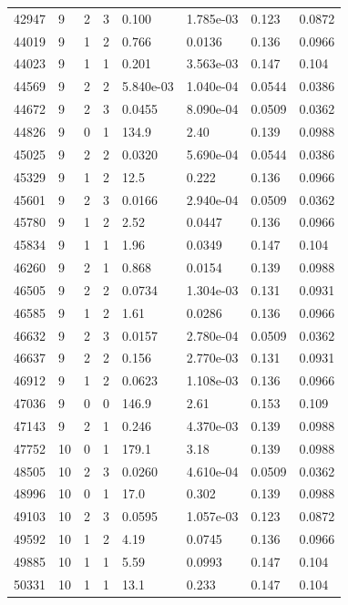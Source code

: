 \documentclass[preview]{standalone}
\begin{document}
{{{{{\begin{tabular}{L{1.2cm}C{1.2cm} C{0.3cm}C{0.5cm} C{1.4cm}C{1.4cm} C{1.4cm}C{1.4cm}}
  42947  &     9  & 2     &  3 &  0.100  & 1.785e-03  & 0.123 &  0.0872   \\ 
  44019  &     9  & 1     &  2 &  0.766  & 0.0136  & 0.136 &  0.0966   \\ 
  44023  &     9  & 1     &  1 &  0.201  & 3.563e-03  & 0.147 &  0.104   \\ 
  44569  &     9  & 2     &  2 &  5.840e-03  & 1.040e-04  & 0.0544 &  0.0386   \\ 
  44672  &     9  & 2     &  3 &  0.0455  & 8.090e-04  & 0.0509 &  0.0362   \\ 
  44826  &     9  & 0     &  1 &  134.9  & 2.40  & 0.139 &  0.0988   \\ 
  45025  &     9  & 2     &  2 &  0.0320  & 5.690e-04  & 0.0544 &  0.0386   \\ 
  45329  &     9  & 1     &  2 &  12.5  & 0.222  & 0.136 &  0.0966   \\ 
  45601  &     9  & 2     &  3 &  0.0166  & 2.940e-04  & 0.0509 &  0.0362   \\ 
  45780  &     9  & 1     &  2 &  2.52  & 0.0447  & 0.136 &  0.0966   \\ 
  45834  &     9  & 1     &  1 &  1.96  & 0.0349  & 0.147 &  0.104   \\ 
  46260  &     9  & 2     &  1 &  0.868  & 0.0154  & 0.139 &  0.0988   \\ 
  46505  &     9  & 2     &  2 &  0.0734  & 1.304e-03  & 0.131 &  0.0931   \\ 
  46585  &     9  & 1     &  2 &  1.61  & 0.0286  & 0.136 &  0.0966   \\ 
  46632  &     9  & 2     &  3 &  0.0157  & 2.780e-04  & 0.0509 &  0.0362   \\ 
  46637  &     9  & 2     &  2 &  0.156  & 2.770e-03  & 0.131 &  0.0931   \\ 
  46912  &     9  & 1     &  2 &  0.0623  & 1.108e-03  & 0.136 &  0.0966   \\ 
  47036  &     9  & 0     &  0 &  146.9  & 2.61  & 0.153 &  0.109   \\ 
  47143  &     9  & 2     &  1 &  0.246  & 4.370e-03  & 0.139 &  0.0988   \\ 
  47752  &    10  & 0     &  1 &  179.1  & 3.18  & 0.139 &  0.0988   \\ 
  48505  &    10  & 2     &  3 &  0.0260  & 4.610e-04  & 0.0509 &  0.0362   \\ 
  48996  &    10  & 0     &  1 &  17.0  & 0.302  & 0.139 &  0.0988   \\ 
  49103  &    10  & 2     &  3 &  0.0595  & 1.057e-03  & 0.123 &  0.0872   \\ 
  49592  &    10  & 1     &  2 &  4.19  & 0.0745  & 0.136 &  0.0966   \\ 
  49885  &    10  & 1     &  1 &  5.59  & 0.0993  & 0.147 &  0.104   \\ 
  50331  &    10  & 1     &  1 &  13.1  & 0.233  & 0.147 &  0.104   \\ 
\hline 
\end{tabular} 

}}}}}
\end{document}
